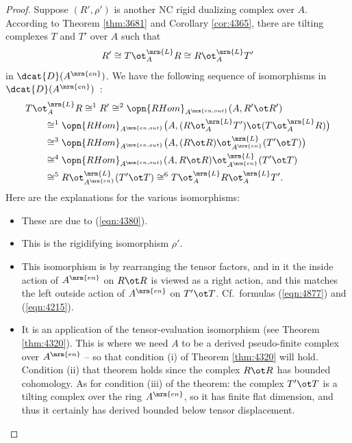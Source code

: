 \begin{proof}
Suppose $(R', \rho')$ is another NC rigid dualizing complex over $A$.
According to Theorem \ref{thm:3681} and Corollary \ref{cor:4365}, there are 
tilting complexes $T$ and $T'$ over $A$ such that 
\begin{equation} \label{eqn:4380}
R' \cong T \ot^{\mrm{L}}_{A} R \cong R \ot^{\mrm{L}}_{A} T'
\end{equation}
in $\dcat{D}(A^{\mrm{en}})$. 
We have the following sequence of isomorphisms in $\dcat{D}(A^{\mrm{en}})$~: 
\begin{equation} \label{eqn:4381}
\begin{aligned}
&
T \ot^{\mrm{L}}_{A} R \cong^{1} R' 
\cong^2 \opn{RHom}_{A^{\mrm{en, out}}}(A, R' \ot R')
\\ & \qquad 
\cong^{1} \opn{RHom}_{A^{\mrm{en, out}}} \bigl( A, (R \ot^{\mrm{L}}_{A} T') \ot 
(T \ot^{\mrm{L}}_{A} R) \bigr)
\\ & \qquad 
\cong^3 \opn{RHom}_{A^{\mrm{en, out}}} \bigl( A, (R \ot R) 
\ot^{\mrm{L}}_{A^{\mrm{en}}} (T' \ot T) \bigr) 
\\ & \qquad 
\cong^4 \opn{RHom}_{A^{\mrm{en, out}}} ( A, R \ot R) 
\ot^{\mrm{L}}_{A^{\mrm{en}}} (T' \ot T)  
\\ & \qquad 
\cong^5 R \ot^{\mrm{L}}_{A^{\mrm{en}}} (T' \ot T) 
\cong^6 T \ot^{\mrm{L}}_{A} R \ot^{\mrm{L}}_{A} T' .
\end{aligned}
\end{equation}
Here are the explanations for the various isomorphisms:
\begin{itemize}
\item[$\cong^{1}$~:] These are due to (\ref{eqn:4380}). 

\item[$\cong^{2}$~:] This is the rigidifying isomorphism $\rho'$.

\item[$\cong^{3}$~:] This isomorphism is by rearranging the tensor factors, and 
in it the inside action of $A^{\mrm{en}}$ on $R \ot R$ is viewed as a right 
action, and this matches the left outside action of $A^{\mrm{en}}$ on 
$T' \ot T$. Cf.\ formulas (\ref{eqn:4877}) and (\ref{eqn:4215}).

\item[$\cong^{4}$~:] It is an application of the tensor-evaluation 
isomorphism (see Theorem \ref{thm:4320}). This is where we need $A$ to be a 
derived pseudo-finite complex over $A^{\mrm{en}}$ -- so that 
condition (i) of Theorem \ref{thm:4320} will hold. 
Condition (ii) that theorem holds since the complex $R \ot R$ 
has bounded cohomology. As for condition (iii) of the theorem: 
the complex $T' \ot T$ is a tilting complex over the ring $A^{\mrm{en}}$,
so it has finite flat dimension, and thus it certainly has derived bounded 
below tensor displacement. 


\end{itemize}
\end{proof}
